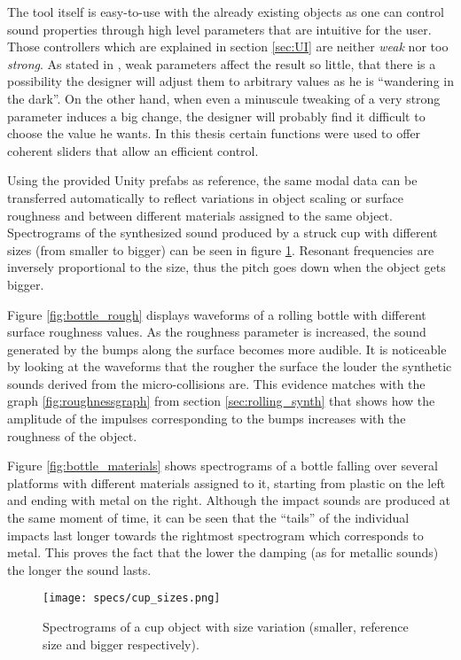 The tool itself is easy-to-use with the already existing objects as one can control sound properties through high level parameters that are intuitive for the user. Those controllers which are explained in section \ref{sec:UI} are neither \textit{weak} nor too \textit{strong}. As stated in \cite{jaffe1995ten}, weak parameters affect the result so little, that there is a possibility the designer will adjust them to arbitrary values as he is ``wandering in the dark''. On the other hand, when even a minuscule tweaking of a very strong parameter induces a big change, the designer will probably find it difficult to choose the value he wants. In this thesis certain functions were used to offer coherent sliders that allow an efficient control.

Using the provided Unity\textsuperscript{\textregistered} prefabs as reference, the same modal data can be transferred automatically to reflect variations in object scaling or surface roughness and between different materials assigned to the same object. Spectrograms of the synthesized sound produced by a struck cup with different sizes (from smaller to bigger) can be seen in figure \ref{fig:cup_sizes}. Resonant frequencies are inversely proportional to the size, thus the pitch goes down when the object gets bigger.

Figure \ref{fig:bottle_rough} displays waveforms of a rolling bottle with different surface roughness values. As the roughness parameter is increased, the sound generated by the bumps along the surface becomes more audible. It is noticeable by looking at the waveforms that the rougher the surface the louder the synthetic sounds derived from the micro-collisions are. This evidence matches with the graph \ref{fig:roughnessgraph} from section \ref{sec:rolling_synth} that shows how the amplitude of the impulses corresponding to the bumps increases with the roughness of the object.

Figure \ref{fig:bottle_materials} shows spectrograms of a bottle falling over several platforms with different materials assigned to it, starting from plastic on the left and ending with metal on the right. Although the impact sounds are produced at the same moment of time, it can be seen that the ``tails'' of the individual impacts last longer towards the rightmost spectrogram which corresponds to metal. This proves the fact that the lower the damping (as for metallic sounds) the longer the sound lasts.

\begin{figure}[H]
  \centering
    \texttt{[image: specs/cup\_sizes.png]}
      \caption{Spectrograms of a cup object with size variation (smaller, reference size and bigger respectively).}
      \label{fig:cup_sizes}
\end{figure}

